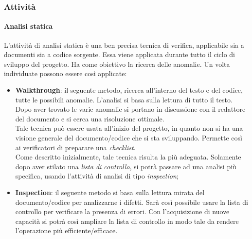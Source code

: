 		\subsubsection{Attività}

			\paragraph{Analisi statica} %
			\label{par:analisi_statica}
			L'attività di analisi statica è una ben precisa tecnica di verifica, applicabile sia a documenti sia a codice sorgente. Essa viene applicata durante tutto il ciclo di sviluppo del progetto. Ha come obiettivo la ricerca delle anomalie. Un volta individuate possono essere così applicate:
			\begin{itemize}
				\item \textbf{Walkthrough}: il seguente metodo, ricerca all'interno del testo e del codice, tutte le possibili anomalie. L'analisi si basa sulla lettura di tutto il testo.\\
				Dopo aver trovato le varie anomalie si portano in discussione con il redattore del documento e si cerca una risoluzione ottimale. \\
				Tale tecnica può essere usata all'inizio del progetto, in quanto non si ha una visione generale del documento/codice che si sta sviluppando. Permette così ai verificatori di preparare una \emph{checklist}.\\
				Come descritto inizialmente, tale tecnica risulta la più adeguata. Solamente dopo aver stilato una \emph{lista di controllo}, si potrà passare ad una analisi più specifica, usando l'attività di analisi di tipo \emph{inspection};
				\item \textbf{Inspection}: il seguente metodo si basa sulla lettura mirata del documento/codice per analizzarne i difetti. Sarà così possibile usare la lista di controllo per verificare la presenza di errori. Con l'acquisizione di nuove capacità si potrà così ampliare la lista di controllo in modo tale da rendere l'operazione più efficiente/efficace.
			\end{itemize}
			
